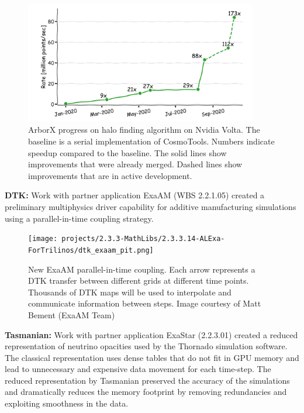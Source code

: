 \begin{figure}[htb]
        \centering \includegraphics[width=4.0in]{projects/2.3.3-MathLibs/2.3.3.14-ALExa-ForTrilinos/arborx_hacc_progress.png} \caption{\label{fig:arborx-hacc}
        ArborX progress on halo finding algorithm on Nvidia Volta. The baseline
        is a serial implementation of CosmoTools. Numbers indicate speedup
        compared to the baseline. The solid lines show improvements that were
        already merged. Dashed lines show improvements that are in active
        development. }
\end{figure}

{\bf DTK:} Work with partner application ExaAM (WBS 2.2.1.05) created a
preliminary multiphysics driver capability for additive manufacturing
simulations using a parallel-in-time coupling strategy.

\begin{figure}[htb]
        \centering \texttt{[image: projects/2.3.3-MathLibs/2.3.3.14-ALExa-ForTrilinos/dtk\_exaam\_pit.png]} \caption{\label{fig:dtk-exaam-pit}
        New ExaAM parallel-in-time coupling. Each arrow represents a DTK
        transfer between different grids at different time points. Thousands
        of DTK maps will be used to interpolate and communicate information
        between steps. Image courtesy of Matt Bement (ExaAM Team) }
\end{figure}

{\bf Tasmanian:} Work with partner application ExaStar (2.2.3.01) created a
reduced representation of neutrino opacities used by the Thornado simulation
software. The classical representation uses dense tables that do not fit in
GPU memory and lead to unnecessary and expensive data movement for each time-step.
The reduced representation by Tasmanian preserved the accuracy of the simulations
and dramatically reduces the memory footprint by removing redundancies
and exploiting smoothness in the data.

